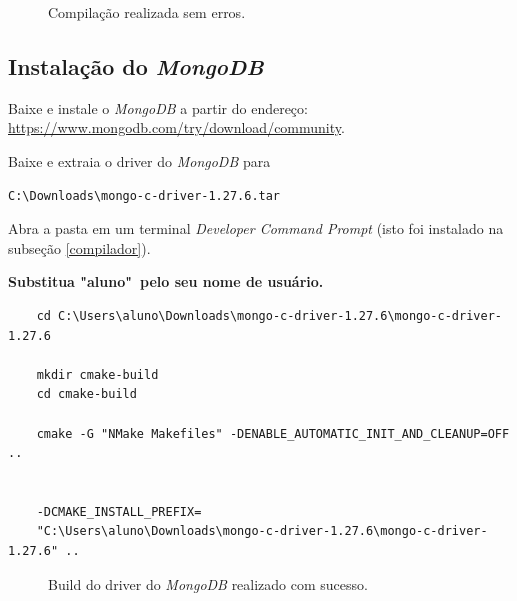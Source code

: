 \documentclass[a4paper,11pt]{article}
\newcommand{\mongo}{\textit{MongoDB}}
\newcommand{\cautionbox}[1]{
	\vskip 5mm
	\begin{leftbar}
		\textbf{#1}
	\end{leftbar}
	\vskip 5mm
}
\begin{document}
\begin{enumerate}
\begin{figure}[H]
	\centering
	\caption{Compilação realizada sem erros.}\label{fig:qt_no_error_compile}
\end{figure}

\end{enumerate}


\subsection{Instalação do \mongo{}}

Baixe e instale o \mongo{} a partir do endereço: \url{https://www.mongodb.com/try/download/community}.


Baixe e extraia o driver do \mongo{} para

\begin{mdframed}
	\begin{verbatim}
C:\Downloads\mongo-c-driver-1.27.6.tar
	\end{verbatim}
\end{mdframed}

Abra a pasta em um terminal \textit{Developer Command Prompt} (isto foi instalado na subseção \ref{compilador}).

\cautionbox{Substitua "aluno"\ pelo seu nome de usuário.}

\small
\begin{mdframed}
\begin{verbatim}
	cd C:\Users\aluno\Downloads\mongo-c-driver-1.27.6\mongo-c-driver-1.27.6
	
	mkdir cmake-build
	cd cmake-build
	
	cmake -G "NMake Makefiles" -DENABLE_AUTOMATIC_INIT_AND_CLEANUP=OFF ..
	
	
	-DCMAKE_INSTALL_PREFIX=
	"C:\Users\aluno\Downloads\mongo-c-driver-1.27.6\mongo-c-driver-1.27.6" ..
\end{verbatim}
\end{mdframed}
\normalsize

\begin{figure}[H]
	\centering
	\caption{Build do driver do \mongo{} realizado com sucesso.}\label{fig:mongodb_build}
\end{figure}
\end{document}
